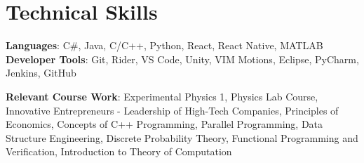 \section{Technical Skills}
 \begin{itemize}[leftmargin=0.15in, label={}]
    \small{\item{
     \textbf{Languages}{: C\#, Java, C/C++, Python, React, React Native, MATLAB} \\
     \textbf{Developer Tools}{: Git, Rider, VS Code, Unity, VIM Motions, Eclipse, PyCharm, Jenkins, GitHub} \\
    }}
    \textbf{Relevant Course Work}{: Experimental Physics 1, Physics Lab Course, Innovative Entrepreneurs - Leadership of High-Tech Companies, Principles of Economics, Concepts of C++ Programming, Parallel Programming, Data Structure Engineering, Discrete Probability Theory, Functional Programming and Verification, Introduction to Theory of Computation} 
 \end{itemize}

